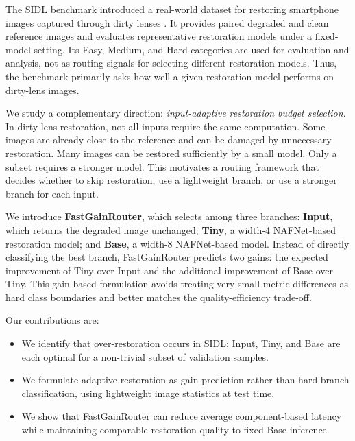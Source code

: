 \documentclass[11pt]{article}
\begin{document}
The SIDL benchmark introduced a real-world dataset for restoring smartphone images captured through dirty lenses \cite{sidl2025}.
It provides paired degraded and clean reference images and evaluates representative restoration models under a fixed-model setting.
Its Easy, Medium, and Hard categories are used for evaluation and analysis, not as routing signals for selecting different restoration models.
Thus, the benchmark primarily asks how well a given restoration model performs on dirty-lens images.

We study a complementary direction: \textit{input-adaptive restoration budget selection}.
In dirty-lens restoration, not all inputs require the same computation.
Some images are already close to the reference and can be damaged by unnecessary restoration.
Many images can be restored sufficiently by a small model.
Only a subset requires a stronger model.
This motivates a routing framework that decides whether to skip restoration, use a lightweight branch, or use a stronger branch for each input.

We introduce \textbf{FastGainRouter}, which selects among three branches:
\textbf{Input}, which returns the degraded image unchanged;
\textbf{Tiny}, a width-4 NAFNet-based restoration model;
and \textbf{Base}, a width-8 NAFNet-based model.
Instead of directly classifying the best branch, FastGainRouter predicts two gains: the expected improvement of Tiny over Input and the additional improvement of Base over Tiny.
This gain-based formulation avoids treating very small metric differences as hard class boundaries and better matches the quality-efficiency trade-off.

\newpage
Our contributions are:
\begin{itemize}
    \item We identify that over-restoration occurs in SIDL: Input, Tiny, and Base are each optimal for a non-trivial subset of validation samples.
    \item We formulate adaptive restoration as gain prediction rather than hard branch classification, using lightweight image statistics at test time.
    \item We show that FastGainRouter can reduce average component-based latency while maintaining comparable restoration quality to fixed Base inference.
\end{itemize}

\end{document}
